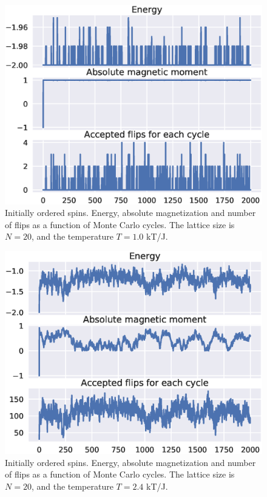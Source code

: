 \documentclass[aps,reprint]{revtex4-1}
\begin{document}
\begin{figure}[H]
  \includegraphics[width=\columnwidth]{figures/4cOrderedT1.eps}
  \caption{Initially ordered spins. Energy, absolute magnetization and number of flips as a function of
  Monte Carlo cycles. The lattice size is $N = 20$, and the temperature $T = 1.0$ kT/J.}
  \label{fig:L20T1Ordered}
\end{figure}

\begin{figure}[H]
  \includegraphics[width=\columnwidth]{figures/4cOrderedT24.eps}
  \caption{Initially ordered spins. Energy, absolute magnetization and number of flips as a function of
  Monte Carlo cycles. The lattice size is $N = 20$, and the temperature $T = 2.4$ kT/J.}
  \label{fig:L20T24Ordered}
\end{figure}
\end{document}
